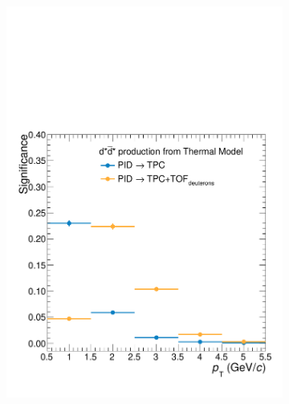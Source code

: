 \begin{figure}
\begin{subfigure}{.33\textwidth}
  \includegraphics[width=\linewidth]{gfx/sig_1}
  \caption{}
  \label{fig:tem12}
\end{subfigure}
\begin{subfigure}{.33\textwidth}
  \centering
  \captionsetup{justification=centering}

\end{subfigure}
\end{figure}
